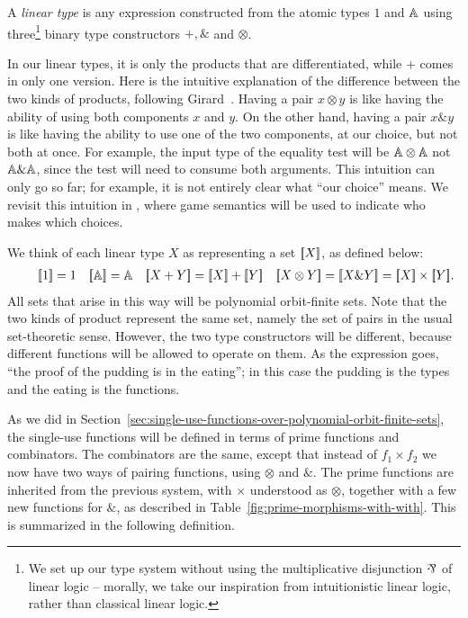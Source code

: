 \documentclass[a4paper,UKenglish,cleveref, autoref, numberwithinsect, thm-restate]{lipics-v2021}
\begin{document}
\begin{definition}\label{def:datatypes}
    A \emph{linear type} is any expression constructed from the atomic types $1$ and $\mathbb A$ using three\footnote{We set up our type system without using the multiplicative disjunction $\rotatebox[origin=c]{180}{\&}$ of linear logic -- morally, we take our inspiration from intuitionistic linear logic, rather than classical linear logic.} binary type constructors $+, \&$ and $\otimes$.
\end{definition}
In our linear types, it is only the products that are differentiated, while  $+$ comes in only one version. 
    Here is the intuitive explanation of the difference between the two kinds of products, following Girard~\cite[p.~2]{girard1995advances}. Having a pair $x \otimes y$ is like having the ability of using both components $x$ and $y$. On the other hand, having a pair $x \& y$ is like having the ability to use one of the two components, at our choice, but not both at once. For example, the input type of the equality test will be $\mathbb A \otimes \mathbb A$ not $\mathbb A \& \mathbb A$, since the test will need to consume both arguments. This intuition can only go so far; for example, it is not entirely clear what ``our choice'' means. We revisit this intuition in , where game semantics will be used to indicate who makes which choices. 



We think of each linear type $X$ as representing a set $[{\kern-0.45ex}[X]{\kern-0.45ex}]$, as defined below:
\begin{align*}
    \qquad \sem{1} = 1
\quad 
\sem{\atoms} = \atoms 
\quad 
\sem{X+Y} = \sem X + \sem Y 
\quad 
\sem{X \otimes Y} =
\sem{X \& Y} = \sem X \times \sem Y.
\end{align*}
All sets that arise in this way will be polynomial orbit-finite sets.
Note that the two kinds of product represent the same set, namely the set of pairs in the usual set-theoretic sense. 
However, the two type constructors will be  different, because different functions will be allowed to operate on them. As the expression goes, ``the proof of the pudding is in the eating''; in this case the pudding is the types and the eating is the functions.  

As we did in Section~\ref{sec:single-use-functions-over-polynomial-orbit-finite-sets}, the single-use functions will be defined in terms of prime functions and combinators. The combinators are the same, except that instead of $f_1 \times f_2$ we now have two ways of pairing functions, using $\otimes$ and $\&$. The prime functions are inherited from the previous system, with $\times$ understood as $\otimes$, together with a few new functions for $\&$, as described in Table~\ref{fig:prime-morphisms-with-with}. This is summarized in the following definition.
\end{document}
